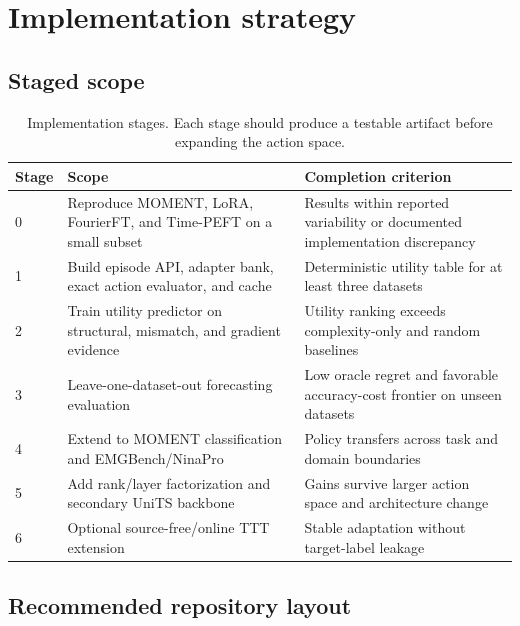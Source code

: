 \documentclass[10pt]{article}
\begin{document}
\section{Implementation strategy}

\subsection{Staged scope}

\begin{table}[t]
\centering
\caption{Implementation stages. Each stage should produce a testable artifact before expanding the action space.}
\label{tab:stages}
\begin{tabularx}{\textwidth}{L{0.12\textwidth}YY}
\toprule
Stage & Scope & Completion criterion \\
 & Reproduce MOMENT, LoRA, FourierFT, and Time-PEFT on a small subset & Results within reported variability or documented implementation discrepancy \\
1 & Build episode API, adapter bank, exact action evaluator, and cache & Deterministic utility table for at least three datasets \\
2 & Train utility predictor on structural, mismatch, and gradient evidence & Utility ranking exceeds complexity-only and random baselines \\
3 & Leave-one-dataset-out forecasting evaluation & Low oracle regret and favorable accuracy-cost frontier on unseen datasets \\
4 & Extend to MOMENT classification and EMGBench/NinaPro & Policy transfers across task and domain boundaries \\
5 & Add rank/layer factorization and secondary UniTS backbone & Gains survive larger action space and architecture change \\
6 & Optional source-free/online TTT extension & Stable adaptation without target-label leakage \\
\bottomrule
\end{tabularx}
\end{table}

\subsection{Recommended repository layout}
\end{document}

